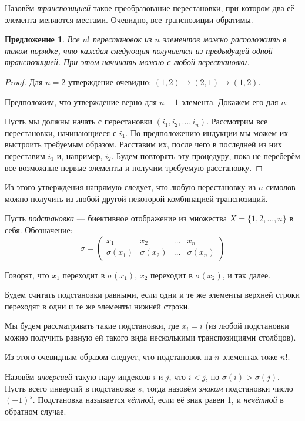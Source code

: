 \documentclass[a4paper, 12pt]{article}
\newtheorem*{proposal}{Предложение}
\begin{document}
Назовём \textit{транспозицией} такое преобразование перестановки, при котором два её элемента меняются местами. Очевидно, все транспозиции обратимы.

\begin{proposal}
    Все $n!$ перестановок из $n$ элементов можно расположить в таком порядке, что каждая следующая получается из предыдущей одной транспозицией. При этом начинать можно с любой перестановки.
\end{proposal}
\begin{proof}
    Для $n = 2$ утверждение очевидно: $(1,2)\to(2,1)\to(1,2)$.

    Предположим, что утверждение верно для $n-1$ элемента. Докажем его для $n$:

    Пусть мы должны начать с перестановки $(i_1, i_2, \ldots, i_n)$. Рассмотрим все перестановки, начинающиеся с $i_1$. По предположению индукции мы можем их выстроить требуемым образом. Расставим их, после чего в последней из них переставим $i_1$ и, например, $i_2$. Будем повторять эту процедуру, пока не переберём все возможные первые элементы и получим требуемую расстановку.
\end{proof}

Из этого утверждения напрямую следует, что любую перестановку из $n$ симолов можно получить из любой другой некоторой комбинацией транспозиций.

Пусть \emph{подстановка} --- биективное отображение из множества $X = \{1, 2,\ldots, n\}$ в себя. Обозначение:
\[
    \sigma = 
    \begin{pmatrix}
        x_1&x_2&\ldots&x_n\\
        \sigma(x_1)&\sigma(x_2)&\ldots&\sigma(x_n)
    \end{pmatrix}
\]

Говорят, что $x_1$ переходит в $\sigma(x_1)$, $x_2$ переходит в $\sigma(x_2)$, и так далее.

Будем считать подстановки равными, если одни и те же элементы верхней строки переходят в одни и те же элементы нижней строки.

Мы будем рассматривать такие подстановки, где $x_i = i$ (из любой подстановки можно получить равную ей такого вида несколькими транспозициями столбцов).

Из этого очевидным образом следует, что подстановок на $n$ элементах тоже $n!$.

Назовём \emph{инверсией} такую пару индексов $i$ и $j$, что $i<j$, но $\sigma(i) > \sigma(j)$. Пусть всего инверсий в подстановке $s$, тогда назовём \emph{знаком} подстановки число $(-1)^s$. Подстановка называется \emph{чётной}, если её знак равен 1, и \emph{нечётной} в обратном случае.
\end{document}

